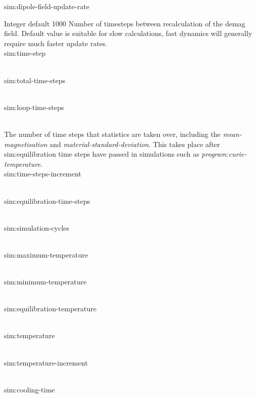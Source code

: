 {\zicf sim:dipole-field-update-rate}
   Integer default 1000
   Number of timesteps between recalculation of the demag field. Default value is suitable for slow calculations, fast dynamics will generally require much faster update rates.\\

{\zicf sim:time-step}\\

{\zicf sim:total-time-steps}\\

{\zicf sim:loop-time-steps}\\
The number of time steps that statistics are taken over, including the \textit{mean-magnetisation} and \textit{material-standard-deviation}. This takes place after sim:equilibration time steps have passed in simulations such as \textit{program:curie-temperature}.\\

{\zicf sim:time-steps-increment}\\

{\zicf sim:equilibration-time-steps}\\

{\zicf sim:simulation-cycles}\\

{\zicf sim:maximum-temperature}\\

{\zicf sim:minimum-temperature}\\

{\zicf sim:equilibration-temperature}\\

{\zicf sim:temperature}\\

{\zicf sim:temperature-increment}\\

{\zicf sim:cooling-time}\\

